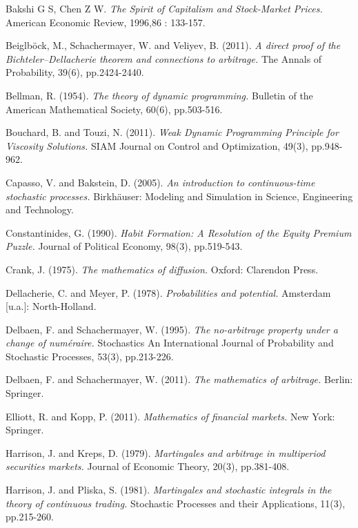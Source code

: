\documentclass[a4paper]{article}
\theoremstyle{definition}
\numberwithin{equation}{section}
\begin{document}
\begin{thebibliography}{9}

 Bakshi G S, Chen Z W. \textit{The Spirit of Capitalism and Stock-Market Prices.} American Economic Review, 1996,86 : 133-157.

 Beiglböck, M., Schachermayer, W. and Veliyev, B. (2011). \emph{A direct proof of the Bichteler–Dellacherie theorem and connections to arbitrage.} The Annals of Probability, 39(6), pp.2424-2440.

 Bellman, R. (1954). \textit{The theory of dynamic programming.} Bulletin of the American Mathematical Society, 60(6), pp.503-516.

 Bouchard, B. and Touzi, N. (2011). \emph{Weak Dynamic Programming Principle for Viscosity Solutions.} SIAM Journal on Control and Optimization, 49(3), pp.948-962.

 Capasso, V. and Bakstein, D. (2005). \textit{An introduction to continuous-time stochastic processes.} Birkhäuser: Modeling and Simulation in Science, Engineering and Technology.

 Constantinides, G. (1990). \emph{Habit Formation: A Resolution of the Equity Premium Puzzle.} Journal of Political Economy, 98(3), pp.519-543.

 Crank, J. (1975). \emph{The mathematics of diffusion.} Oxford: Clarendon Press.

 Dellacherie, C. and Meyer, P. (1978). \textit{Probabilities and potential.} Amsterdam [u.a.]: North-Holland.

 Delbaen, F. and Schachermayer, W. (1995). \textit{The no-arbitrage property under a change of num\'eraire.} Stochastics An International Journal of Probability and Stochastic Processes, 53(3), pp.213-226.

 Delbaen, F. and Schachermayer, W. (2011). \textit{The mathematics of arbitrage.} Berlin: Springer.

 Elliott, R. and Kopp, P. (2011). \emph{Mathematics of financial markets.} New York: Springer.

 Harrison, J. and Kreps, D. (1979). \textit{Martingales and arbitrage in multiperiod securities markets.} Journal of Economic Theory, 20(3), pp.381-408.

 Harrison, J. and Pliska, S. (1981). \textit{Martingales and stochastic integrals in the theory of continuous trading.} Stochastic Processes and their Applications, 11(3), pp.215-260.


\end{thebibliography}
\end{document}
